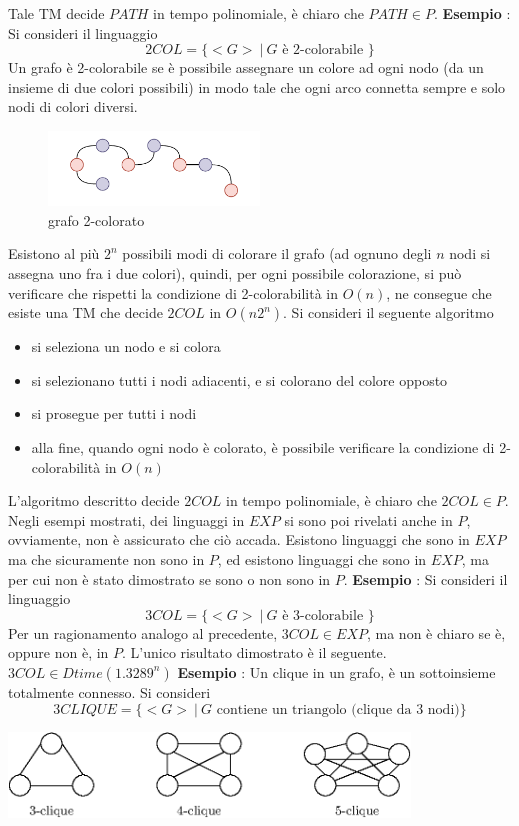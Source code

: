 \documentclass[10pt, letterpaper]{report}
\begin{document}
Tale TM decide $PATH$ in tempo polinomiale, è chiaro che $PATH\in P$.\acc 
\textbf{Esempio} : Si consideri il linguaggio 
$$ 2COL=\{<G> \ |\ G\text{ è 2-colorabile }\}$$
Un grafo è 2-colorabile se è possibile assegnare un colore ad ogni nodo (da un insieme di due colori possibili) in modo tale che ogni arco connetta sempre e solo nodi di colori diversi.\begin{figure}[h!]
    \centering
    \includegraphics[width=0.5\textwidth ]{images/2COL.pdf}
    \caption{grafo 2-colorato}
\end{figure}
Esistono al più $2^n$ possibili modi di colorare il grafo (ad ognuno degli $n$ nodi si assegna uno fra i due colori), quindi, per ogni possibile colorazione, si può verificare che rispetti la condizione di 2-colorabilità in $O(n)$, ne consegue che esiste una TM che decide $2COL$ in $O(n2^n)$. \acc 
Si consideri il seguente algoritmo\begin{itemize}
    \item si seleziona un nodo e si colora 
    \item si selezionano tutti i nodi adiacenti, e si colorano del colore opposto 
    \item si prosegue per tutti i nodi 
    \item alla fine, quando ogni nodo è colorato, è possibile verificare la condizione di 2-colorabilità in $O(n)$
\end{itemize}
L'algoritmo descritto decide $2COL$ in tempo polinomiale, è chiaro che $2COL\in P$.\acc 
Negli esempi mostrati, dei linguaggi in $EXP$ si sono poi rivelati anche in $P$, ovviamente, non è assicurato che ciò accada. Esistono linguaggi che sono in $EXP$ ma che sicuramente non sono in $P$, ed esistono linguaggi che sono in $EXP$, ma per cui non è stato dimostrato se sono o non sono in $P$.\acc 
\textbf{Esempio} : Si consideri il linguaggio 
$$ 3COL=\{<G> \ |\ G\text{ è 3-colorabile }\}$$
Per un ragionamento analogo al precedente, $3COL\in EXP$, ma non è chiaro se è, oppure non è, in $P$. L'unico risultato dimostrato è il seguente. \acc 
\teo{} $3COL\in Dtime(1.3289^n)$\acc 
\textbf{Esempio} : Un clique in un grafo, è un sottoinsieme totalmente connesso. Si consideri 
$$ 3CLIQUE=\{<G> \ | \ G \text{ contiene un triangolo (clique da 3 nodi)}\}$$\begin{center}
    \includegraphics[width=0.8\textwidth ]{images/clique.eps}
\end{center}
\end{document}
